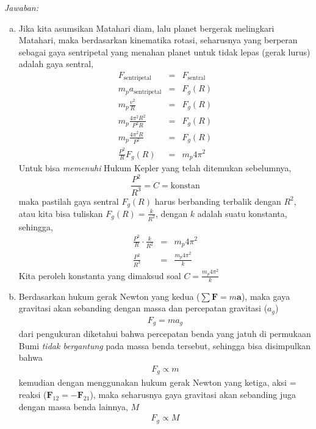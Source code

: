 \documentclass[11pt,fleqn]{exam}
\begin{document}
\begin{questions}
\newpage
\textit{Jawaban:}
\begin{enumerate}[a.]
    \item Jika kita asumsikan Matahari diam, lalu planet bergerak melingkari Matahari, maka berdasarkan kinematika rotasi, seharusnya yang berperan sebagai gaya sentripetal yang menahan planet untuk tidak lepas (gerak lurus) adalah gaya sentral,
    \begin{eqnarray*}
        F_\text{sentripetal} &=& F_\text{sentral}\\
        m_p a_\text{sentripetal} &=& F_g(R)\\
        m_p \frac{v^2}{R} &=& F_g(R)\\
        m_p\frac{4 \pi^2 R^2}{P^2 R} &=& F_g(R)\\
        m_p\frac{4 \pi^2 R}{P^2} &=& F_g(R)\\
        \frac{P^2}{R} F_g(R) &=& m_p 4 \pi^2
    \end{eqnarray*}
    Untuk bisa \textit{memenuhi} Hukum Kepler yang telah ditemukan sebelumnya, 
    \begin{equation*}
        \frac{P^2}{R^3} = C = \text{konstan}
    \end{equation*}
    maka pastilah gaya sentral $F_g(R)$ harus berbanding terbalik dengan $R^2$, atau kita bisa tuliskan $F_g(R) = \frac{k}{R^2}$, dengan $k$ adalah suatu konstanta, sehingga,
    \begin{eqnarray*}
        \frac{P^2}{R} \cdot \frac{k}{R^2} &=& m_p 4 \pi^2\\
        \frac{P^2}{R^3} &=& \frac{m_p 4 \pi^2}{k}
    \end{eqnarray*}
    Kita peroleh konstanta yang dimaksud soal $C = \frac{m_p 4 \pi^2}{k}$
    
    \item Berdasarkan hukum gerak Newton yang kedua ($\sum \textbf{F} = m \textbf{a}$), maka gaya gravitasi akan sebanding dengan massa dan percepatan gravitasi ($a_g$)
    \begin{eqnarray*}
        F_g = m a_g
    \end{eqnarray*}
    dari pengukuran diketahui bahwa percepatan benda yang jatuh di permukaan Bumi \textit{tidak bergantung} pada massa benda tersebut, sehingga bisa disimpulkan bahwa 
    \begin{eqnarray*}
        F_g \propto m
    \end{eqnarray*}
    kemudian dengan menggunakan hukum gerak Newton yang ketiga, aksi = reaksi ($\textbf{F}_{12} = -\textbf{F}_{21}$), maka seharusnya gaya gravitasi akan sebanding juga dengan massa benda lainnya, $M$
    \begin{eqnarray*}
        F_g \propto M    
    \end{eqnarray*}


\end{enumerate}
\end{questions}
\end{document}
